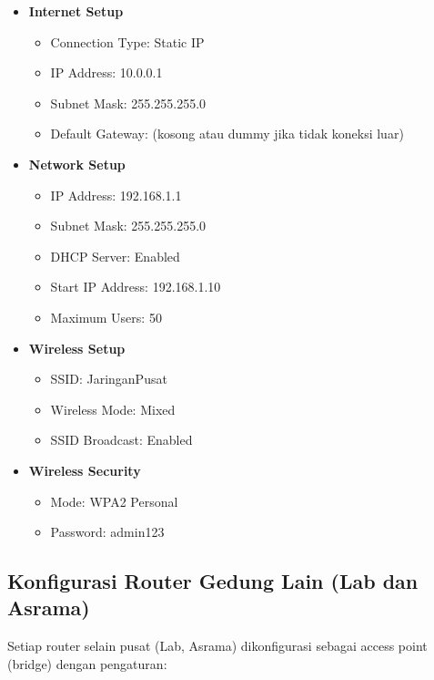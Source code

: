 \begin{itemize}
  \item \textbf{Internet Setup}
  \begin{itemize}
    \item Connection Type: Static IP
    \item IP Address: 10.0.0.1
    \item Subnet Mask: 255.255.255.0
    \item Default Gateway: (kosong atau dummy jika tidak koneksi luar)
  \end{itemize}
  
  \item \textbf{Network Setup}
  \begin{itemize}
    \item IP Address: 192.168.1.1
    \item Subnet Mask: 255.255.255.0
    \item DHCP Server: Enabled
    \item Start IP Address: 192.168.1.10
    \item Maximum Users: 50
  \end{itemize}
  
  \item \textbf{Wireless Setup}
  \begin{itemize}
    \item SSID: JaringanPusat
    \item Wireless Mode: Mixed
    \item SSID Broadcast: Enabled
  \end{itemize}
  
  \item \textbf{Wireless Security}
  \begin{itemize}
    \item Mode: WPA2 Personal
    \item Password: admin123
  \end{itemize}
\end{itemize}

\subsection{Konfigurasi Router Gedung Lain (Lab dan Asrama)}

Setiap router selain pusat (Lab, Asrama) dikonfigurasi sebagai access point (bridge) dengan pengaturan:

